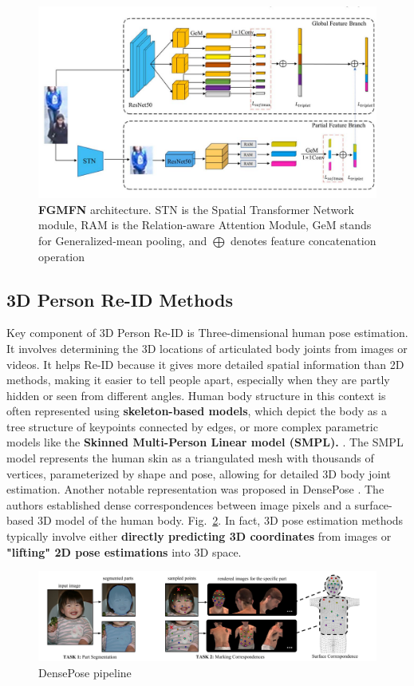 \documentclass[12pt, a4paper]{article}
\begin{document}
 \begin{figure}[h]
    \centering
    \includegraphics[width=0.8\linewidth]{pictures/FGMFN_pipe.jpeg}
    \caption{\textbf{FGMFN} architecture. STN is the Spatial Transformer Network module, RAM is the Relation-aware Attention Module, GeM stands for Generalized-mean pooling, and $\bigoplus$ denotes feature concatenation operation}
    \label{fig:FGMFN_pipe}
\end{figure}

\subsection{3D Person Re-ID Methods}
Key component of 3D Person Re-ID is Three-dimensional human pose estimation. It involves determining the 3D locations of articulated body joints from images or videos. It helps Re-ID because it gives more detailed spatial information than 2D methods, making it easier to tell people apart, especially when they are partly hidden or seen from different angles. Human body structure in this context is often represented using \textbf{skeleton-based models}, which depict the body as a tree structure of keypoints connected by edges, or more complex parametric models like the \textbf{Skinned Multi-Person Linear model (SMPL).} \cite{SMPL}. The SMPL model represents the human skin as a triangulated mesh with thousands of vertices, parameterized by shape and pose, allowing for detailed 3D body joint estimation. Another notable representation was proposed in DensePose \cite{DensePose}. The authors established dense correspondences between image pixels and a surface-based 3D model of the human body. Fig.~\ref{fig:DensePose}. In fact, 3D pose estimation methods typically involve either \textbf{directly predicting 3D coordinates} from images or \textbf{"lifting" 2D pose estimations} into 3D space.

 \begin{figure}[h]
    \centering
    \includegraphics[width=0.8\linewidth]{pictures/DensePose.pdf}
    \caption{DensePose pipeline}
    \label{fig:DensePose}
\end{figure}
\end{document}
